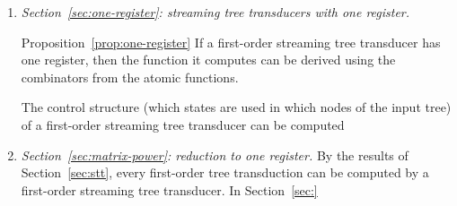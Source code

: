 \begin{enumerate}
     \item \emph{Section~\ref{sec:one-register}: streaming tree transducers with one register.} 
     
     \announce
    {Proposition~\ref{prop:one-register}}
    {If a first-order streaming tree transducer has one register, then the function it computes can be derived using the combinators from the atomic functions.}
    
     
     The control structure (which states are used in which nodes of the input tree) of a first-order streaming tree transducer can be computed 
    \item \emph{Section~\ref{sec:matrix-power}: reduction to one register.} By the results of Section~\ref{sec:stt}, every first-order tree transduction can be computed by a first-order streaming tree transducer. In Section~\ref{sec:}
    
\end{enumerate}
